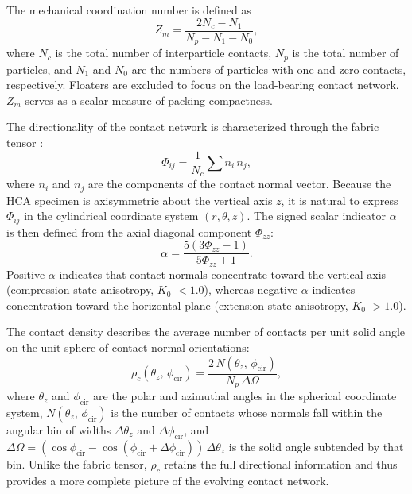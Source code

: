 \documentclass[a4paper,fleqn]{cas-sc}
\newcommand{\Kzero}{\ensuremath{K_0}}
\begin{document}
The mechanical coordination number \citep{Thornton2000,Oda1977} is defined as
\begin{equation}
Z_m = \frac{2N_c - N_1}{N_p - N_1 - N_0},
\label{eq:zm_definition_method}
\end{equation}
where $N_c$ is the total number of interparticle contacts, $N_p$ is the total number of particles, and $N_1$ and $N_0$ are the numbers of particles with one and zero contacts, respectively. Floaters are excluded to focus on the load-bearing contact network. $Z_m$ serves as a scalar measure of packing compactness.

The directionality of the contact network is characterized through the fabric tensor \citep{Oda1982fabric,Oda1982stat}:
\begin{equation}
\Phi_{ij} = \frac{1}{N_c}\sum n_i\,n_j,
\label{eq:fabric_tensor}
\end{equation}
where $n_i$ and $n_j$ are the components of the contact normal vector. Because the HCA specimen is axisymmetric about the vertical axis $z$, it is natural to express $\Phi_{ij}$ in the cylindrical coordinate system $(r,\theta,z)$. The signed scalar indicator $\alpha$ \citep{YimsiriSoga2010,Otsubo2022} is then defined from the axial diagonal component $\Phi_{zz}$:
\begin{equation}
\alpha = \frac{5(3\Phi_{zz} - 1)}{5\Phi_{zz} + 1}.
\label{eq:alpha_definition_method}
\end{equation}
Positive $\alpha$ indicates that contact normals concentrate toward the vertical axis (compression-state anisotropy, \Kzero{} $< 1.0$), whereas negative $\alpha$ indicates concentration toward the horizontal plane (extension-state anisotropy, \Kzero{} $> 1.0$).

The contact density \citep{Han2023} describes the average number of contacts per unit solid angle on the unit sphere of contact normal orientations:
\begin{equation}
\rho_c(\theta_z,\,\phi_{\mathrm{cir}}) = \frac{2\,N(\theta_z,\,\phi_{\mathrm{cir}})}{N_p\,\Delta\Omega},
\label{eq:contact_density}
\end{equation}
where $\theta_z$ and $\phi_{\mathrm{cir}}$ are the polar and azimuthal angles in the spherical coordinate system, $N(\theta_z,\,\phi_{\mathrm{cir}})$ is the number of contacts whose normals fall within the angular bin of widths $\Delta\theta_z$ and $\Delta\phi_{\mathrm{cir}}$, and $\Delta\Omega = (\cos\phi_{\mathrm{cir}} - \cos(\phi_{\mathrm{cir}}+\Delta\phi_{\mathrm{cir}}))\,\Delta\theta_z$ is the solid angle subtended by that bin. Unlike the fabric tensor, $\rho_c$ retains the full directional information and thus provides a more complete picture of the evolving contact network.
\end{document}
